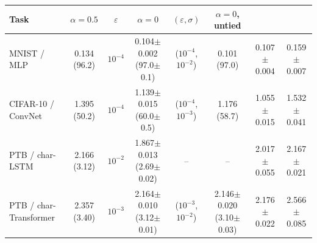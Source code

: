 \begin{tabular}{l c cc cc cc}
\toprule
Task & $\alpha{=}0.5$ & $\varepsilon$ & $\alpha{=}0$ & $(\varepsilon,\sigma)$ & $\alpha{=}0$, untied & \INP{} & \ANPb{} \\
\midrule
MNIST / MLP & 0.134 (96.2) & $10^{-4}$ & 0.104$\pm$0.002 (97.0$\pm$0.1) & ($10^{-4}$, $10^{-2}$) & 0.101 (97.0) & 0.107$\pm$0.004 & 0.159$\pm$0.007 \\
CIFAR-10 / ConvNet & 1.395 (50.2) & $10^{-4}$ & 1.139$\pm$0.015 (60.0$\pm$0.5) & ($10^{-4}$, $10^{-3}$) & 1.176 (58.7) & 1.055$\pm$0.015 & 1.532$\pm$0.041 \\
PTB / char-LSTM & 2.166 (3.12) & $10^{-2}$ & 1.867$\pm$0.013 (2.69$\pm$0.02) & -- & -- & 2.017$\pm$0.055 & 2.167$\pm$0.021 \\
PTB / char-Transformer & 2.357 (3.40) & $10^{-3}$ & 2.164$\pm$0.010 (3.12$\pm$0.01) & ($10^{-3}$, $10^{-2}$) & 2.146$\pm$0.020 (3.10$\pm$0.03) & 2.176$\pm$0.022 & 2.566$\pm$0.085 \\
\bottomrule
\end{tabular}
